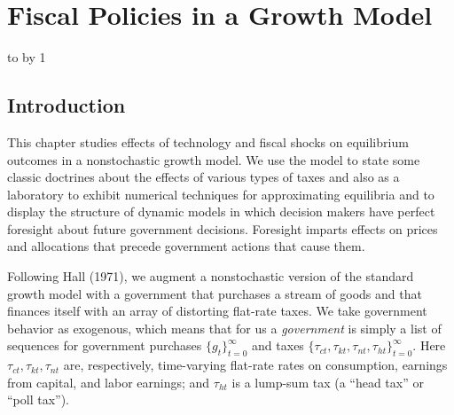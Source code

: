 

%





\def\toone{{t+1}}
\def\ttwo{{t+2}}
\def\tthree{{t+3}}
\def\Tone{{T+1}}
\def\TTT{{T-1}}
\def\rtr{{\rm tr}}

\chapter{Fiscal Policies in a Growth Model\label{linappro}}

\shipout\vbox{\vbox to\vsize{}}
\advance\pageno by 1

\section{Introduction}

This chapter studies  effects of technology and fiscal shocks
on equilibrium outcomes in a nonstochastic growth model. We
use the model to state some classic doctrines about the effects of various types of taxes and also
 as a laboratory to exhibit  numerical
techniques for approximating equilibria and to display the
structure of dynamic models in which decision makers have perfect
foresight about future government decisions.  Foresight imparts   effects on prices and allocations that precede
 government actions that cause them.

Following Hall (1971), we augment a nonstochastic version of the
standard growth model with a government that purchases a stream of
goods and that finances itself with an array of distorting flat-rate
taxes. We take government behavior as exogenous,
which means that for us a {\it government\/} is
 simply a list of sequences for government purchases $\{g_t\}_{t=0}^\infty$
and   taxes $\{\tau_{ct},  \tau_{kt}, \tau_{nt},
\tau_{ht}\}_{t=0}^\infty$. Here $\tau_{ct}, \tau_{kt}, \tau_{nt}$
are, respectively, time-varying flat-rate rates on consumption,
earnings from capital, and labor earnings;  and $\tau_{ht}$ is a lump-sum tax (a ``head
tax'' or ``poll tax'').

